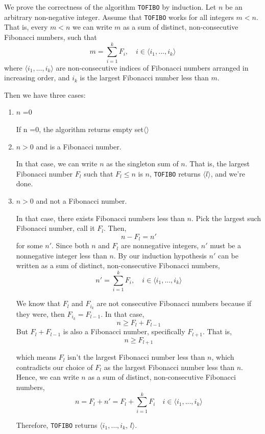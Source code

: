 \documentclass[12pt]{article}
\begin{document}
\begin{solution}
    \bbni

    We prove the correctness of the algorithm \texttt{TOFIBO} by induction. Let $n$ be an arbitrary non-negative integer. Assume that \texttt{TOFIBO} works for all integers $m < n$. That is, every $m < n$ we can write $m$ as a sum of distinct, non-consecutive Fibonacci numbers, such that 
    \[m = \sum_{i=1}^{k}F_i, \quad i \in \langle  i_1, ..., i_k \rangle\]
    where $\langle  i_1, ..., i_k \rangle$ are non-consecutive indices of Fibonacci numbers arranged in increasing order, and $i_k$ is the largest Fibonacci number less than $m$. 

    Then we have three cases: 
    \begin{enumerate}
        \item $n$ =0 
        
        If n =0, the algorithm returns empty set$\langle \rangle$
        
        \item $n > 0$ and is a Fibonacci number. 
        
        In that case, we can write $n$ as the singleton sum of $n$. That is, the largest Fibonacci number $F_l$ such that $F_l \leq n$ is $n$, \texttt{TOFIBO} returns $\langle l \rangle$, and we're done.  

        \item $n> 0$ and not a Fibonacci number. 
        
        In that case, there exists Fibonacci numbers less than $n$. Pick the largest such Fibonacci number, call it $F_{l}$. Then, 
        \[n - F_l = n'\]
        for some $n'$. Since both $n$ and $F_l$ are nonnegative integers, $n'$ must be a nonnegative integer less than $n$. By our induction hypothesis $n'$ can be written as a sum of distinct, non-consecutive Fibonacci numbers, 
        \[n' = \sum_{i=1}^{k}F_i, \quad i \in \langle  i_1, ..., i_k \rangle\]

        We know that $F_l$ and $F_{i_k}$ are not consecutive Fibonacci numbers because if they were, then $F_{i_k} = F_{l-1}$. In that case,
         \[n \geq F_l + F_{l-1}\]
        But $F_l + F_{l-1}$ is also a Fibonacci number, specifically $F_{l+1}$. That is, 
         \[n \geq F_{l+1}\]


        which means $F_l$ isn't the largest Fibonacci number less than $n$, which contradicts our choice of $F_l$ as the largest Fibonacci number less than $n$. 
        Hence, we can write $n$ as a sum of distinct, non-consecutive Fibonacci numbers,  
        \[n = F_l + n' = F_l + \sum_{i=1}^{k} F_i \quad i \in  \langle  i_1, ..., i_k \rangle\]

        Therefore, \texttt{TOFIBO} returns $\langle i_1, \ldots, i_k, \, l\rangle$. 
    \end{enumerate}
\end{solution}
\end{document}
